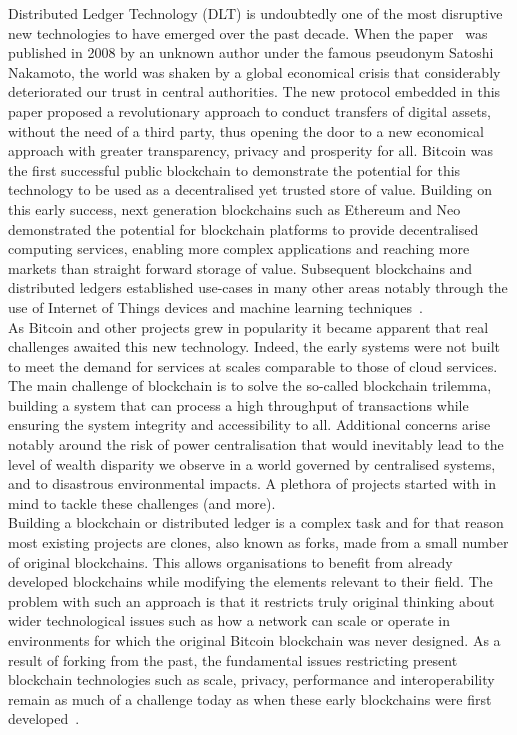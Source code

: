 Distributed Ledger Technology (DLT) is undoubtedly one of the most disruptive new technologies to have emerged over the past decade. When the paper~\cite{nakamoto} was published in 2008 by an unknown author under the famous pseudonym Satoshi Nakamoto, the world was shaken by a global economical crisis that considerably deteriorated our trust in central authorities. The new protocol embedded in this paper proposed a revolutionary approach to conduct transfers of digital assets, without the need of a third party, thus opening the door to a new economical approach with greater transparency, privacy and prosperity for all. Bitcoin was the first successful public blockchain to demonstrate the potential for this technology to be used as a decentralised yet trusted store of value. Building on this early success, next generation blockchains such as Ethereum and Neo demonstrated the potential for blockchain platforms to provide decentralised computing services, enabling more complex applications and reaching more markets than straight forward storage of value. Subsequent blockchains and distributed ledgers established use-cases in many other areas notably through the use of Internet of Things devices and machine learning techniques~\cite{govuk}.\\

As Bitcoin and other projects grew in popularity it became apparent that real challenges awaited this new technology. Indeed, the early systems were not built to meet the demand for services at scales comparable to those of cloud services. The main challenge of blockchain is to solve the so-called blockchain trilemma, building a system that can process a high throughput of transactions while ensuring the system integrity and accessibility to all. Additional concerns arise notably around the risk of power centralisation that would inevitably lead to the level of wealth disparity we observe in a world governed by centralised systems, and to disastrous environmental impacts. A plethora of projects started with in mind to tackle these challenges (and more).\\

Building a blockchain or distributed ledger is a complex task and for that reason most existing projects are clones, also known as forks, made from a small number of original blockchains. This allows organisations to benefit from already developed blockchains while modifying the elements relevant to their field. The problem with such an approach is that it restricts truly original thinking about wider technological issues such as how a network can scale or operate in environments for which the original Bitcoin blockchain was never designed. As a result of forking from the past, the fundamental issues restricting present blockchain technologies such as scale, privacy, performance and interoperability remain as much of a challenge today as when these early blockchains were first developed~\cite{obst}.\\

